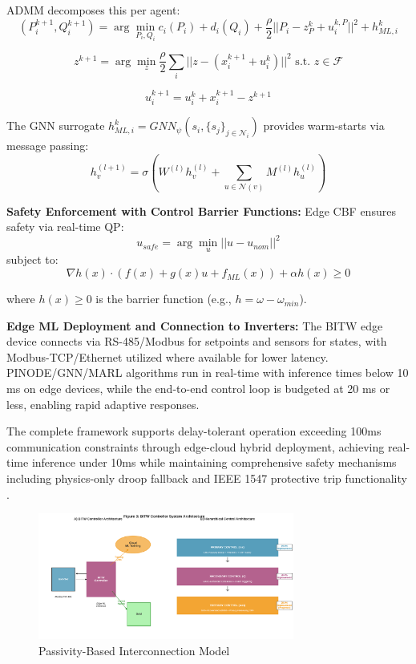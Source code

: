 \documentclass[12pt]{article}
\begin{document}
ADMM decomposes this per agent:
$$(P_i^{k+1}, Q_i^{k+1}) = \arg\min_{P_i,Q_i} c_i(P_i) + d_i(Q_i) + \frac{\rho}{2}||P_i - z_P^k + u_i^{k,P}||^2 + h_{ML,i}^k$$

$$z^{k+1} = \arg\min_z \frac{\rho}{2}\sum_i ||z - (x_i^{k+1} + u_i^k)||^2 \text{ s.t. } z \in \mathcal{F}$$

$$u_i^{k+1} = u_i^k + x_i^{k+1} - z^{k+1}$$

The GNN surrogate $h_{ML,i}^k = GNN_{\psi}(s_i, \{s_j\}_{j \in \mathcal{N}_i})$ provides warm-starts via message passing:
$$h_v^{(l+1)} = \sigma\left(W^{(l)} h_v^{(l)} + \sum_{u \in \mathcal{N}(v)} M^{(l)} h_u^{(l)}\right)$$

\textbf{Safety Enforcement with Control Barrier Functions:} Edge CBF ensures safety via real-time QP:
$$u_{safe} = \arg\min_u ||u - u_{nom}||^2$$
subject to:
$$\nabla h(x) \cdot (f(x) + g(x)u + f_{ML}(x)) + \alpha h(x) \geq 0$$

where $h(x) \geq 0$ is the barrier function (e.g., $h = \omega - \omega_{min}$).

\textbf{Edge ML Deployment and Connection to Inverters:} The BITW edge device connects via RS-485/Modbus for setpoints and sensors for states, with Modbus-TCP/Ethernet utilized where available for lower latency. PINODE/GNN/MARL algorithms run in real-time with inference times below 10 ms on edge devices, while the end-to-end control loop is budgeted at 20 ms or less, enabling rapid adaptive responses.

The complete framework supports delay-tolerant operation exceeding 100ms communication constraints through edge-cloud hybrid deployment, achieving real-time inference under 10ms while maintaining comprehensive safety mechanisms including physics-only droop fallback and IEEE 1547 protective trip functionality \cite{ieee1547}.

\begin{figure}[H]
\centering
\includegraphics[width=0.75\textwidth]{figure3_system_architecture.pdf}
\caption{Passivity-Based Interconnection Model}
\end{figure}
\end{document}
